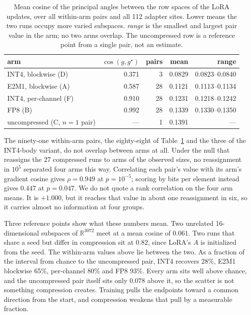 \documentclass[11pt,letterpaper]{article}
\begin{document}
\begin{table}[htbp]
\centering
\small
\caption{Mean cosine of the principal angles between the row spaces of the LoRA updates, over all within-arm pairs and all 112 adapter sites. Lower means the two runs occupy more varied subspaces. \emph{range} is the smallest and largest pair value in the arm; no two arms overlap. The uncompressed row is a reference point from a single pair, not an estimate.}
\label{tab:subspace}
\begin{tabular}{lrrrr}
\toprule
arm & $\cos(g,g^\star)$ & pairs & mean & range \\
\midrule
INT4, blockwise (D)  & 0.371 &  3 & 0.0829 & 0.0823--0.0840 \\
E2M1, blockwise (A)  & 0.587 & 28 & 0.1121 & 0.1113--0.1134 \\
INT4, per-channel (F) & 0.910 & 28 & 0.1231 & 0.1218--0.1242 \\
FP8 (B)              & 0.992 & 28 & 0.1339 & 0.1330--0.1350 \\
\midrule
uncompressed (C, $n{=}1$ pair) & --- & 1 & 0.1391 & --- \\
\bottomrule
\end{tabular}
\end{table}

The ninety-one within-arm pairs, the eighty-eight of Table~\ref{tab:subspace} and the three of the INT4-body variant, do not overlap between arms at all. Under the null that reassigns the 27 compressed runs to arms of the observed sizes, no reassignment in $10^5$ separated four arms this way. Correlating each pair's value with its arm's gradient cosine gives $\rho = 0.949$ at $p = 10^{-5}$; scoring by bits per element instead gives $0.447$ at $p = 0.047$. We do not quote a rank correlation on the four arm means. It is $+1.000$, but it reaches that value in about one reassignment in six, so it carries almost no information at four groups.

Three reference points show what these numbers mean. Two unrelated 16-dimensional subspaces of $\mathbb{R}^{3072}$ meet at a mean cosine of $0.061$. Two runs that share a seed but differ in compression sit at $0.82$, since LoRA's $A$ is initialized from the seed. The within-arm values above lie between the two. As a fraction of the interval from chance to the uncompressed pair, INT4 recovers 28\%, E2M1 blockwise 65\%, per-channel 80\% and FP8 93\%. Every arm sits well above chance, and the uncompressed pair itself sits only $0.078$ above it, so the scatter is not something compression creates. Training pulls the endpoints toward a common direction from the start, and compression weakens that pull by a measurable fraction.
\end{document}
